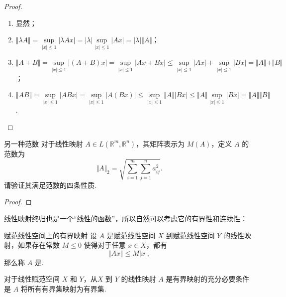 \begin{proof}
    \begin{enumerate}
        \item 显然；
        \item $\Vert \lambda A\Vert=\sup\limits_{\vert x\vert\leqslant 1}\vert \lambda Ax\vert=\vert\lambda\vert\sup\limits_{\vert x\vert\leqslant 1}\vert Ax\vert=\vert\lambda\vert\Vert A\Vert$；
        \item $\Vert A+B\Vert=\sup\limits_{\vert x\vert\leqslant 1}\vert (A+B)x\vert = \sup\limits_{\vert x\vert\leqslant 1}\vert Ax + Bx\vert\leqslant\sup\limits_{\vert x\vert\leqslant 1}\vert Ax\vert+\sup\limits_{\vert x\vert\leqslant 1}\vert Bx\vert=\Vert A\Vert+\Vert B\Vert$；
        \item $\Vert AB\Vert=\sup\limits_{\vert x\vert\leqslant 1}\vert ABx\vert=\sup\limits_{\vert x\vert\leqslant 1}\vert A(Bx)\vert\leqslant\sup\limits_{\vert x\vert\leqslant 1}\Vert A\Vert\vert Bx\vert\leqslant\Vert A\Vert\sup\limits_{\vert x\vert\leqslant 1}\vert Bx\vert=\Vert A\Vert\Vert B\Vert$.
    \end{enumerate}
\end{proof}

\begin{example}{另一种范数}{}
    对于线性映射 $A\in L(\mathbb{R}^m, \mathbb{R}^n)$，其矩阵表示为 $M(A)$，定义 $A$ 的范数为 \[\Vert A\Vert_2 = \sqrt{\sum_{i=1}^{m}\sum_{j=1}^{n}a_{ij}^2}.\]
    请验证其满足范数的四条性质.
\end{example}

\begin{proof}

\end{proof}

线性映射终归也是一个“线性的函数”，所以自然可以考虑它的有界性和连续性：

\begin{definition}{赋范线性空间上的有界映射}{}
    设 $A$ 是赋范线性空间 $X$ 到赋范线性空间 $Y$ 的线性映射，如果存在常数 $M\leqslant 0$ 使得对于任意 $x\in X$，都有 \[\Vert Ax\Vert\leqslant M\vert x\vert,\]
    那么称 $A$ 是.
\end{definition}

\begin{theorem}{}{}
    对于线性赋范空间 $X$ 和 $Y$，从$X$ 到 $Y$ 的线性映射 $A$ 是有界映射的充分必要条件是 $A$ 将所有有界集映射为有界集.
\end{theorem}

